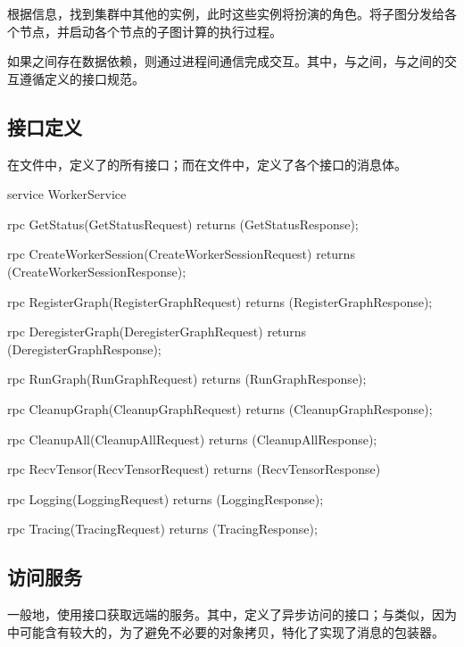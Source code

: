 \begin{content}
\begin{content}
\begin{content}
根据信息，找到集群中其他的实例，此时这些实例将扮演的角色。将子图分发给各个节点，并启动各个节点的子图计算的执行过程。

如果之间存在数据依赖，则通过进程间通信完成交互。其中，与之间，与之间的交互遵循定义的接口规范。

\subsection{接口定义}

在文件中，定义了的所有接口；而在文件中，定义了各个接口的消息体。

\begin{leftbar}
\begin{c++}
service WorkerService {
  rpc GetStatus(GetStatusRequest) 
      returns (GetStatusResponse);

  rpc CreateWorkerSession(CreateWorkerSessionRequest)
      returns (CreateWorkerSessionResponse);

  rpc RegisterGraph(RegisterGraphRequest) 
      returns (RegisterGraphResponse);

  rpc DeregisterGraph(DeregisterGraphRequest) 
      returns (DeregisterGraphResponse);

  rpc RunGraph(RunGraphRequest) 
      returns (RunGraphResponse);

  rpc CleanupGraph(CleanupGraphRequest) 
      returns (CleanupGraphResponse);

  rpc CleanupAll(CleanupAllRequest) 
      returns (CleanupAllResponse);

  rpc RecvTensor(RecvTensorRequest) 
      returns (RecvTensorResponse) {
  }

  rpc Logging(LoggingRequest) 
      returns (LoggingResponse);

  rpc Tracing(TracingRequest) 
      returns (TracingResponse);
}
\end{c++}
\end{leftbar}

\subsection{访问服务}

一般地，使用接口获取远端的服务。其中，定义了异步访问的接口；与类似，因为中可能含有较大的，为了避免不必要的对象拷贝，特化了实现了消息的包装器。


\end{content}
\end{content}
\end{content}
